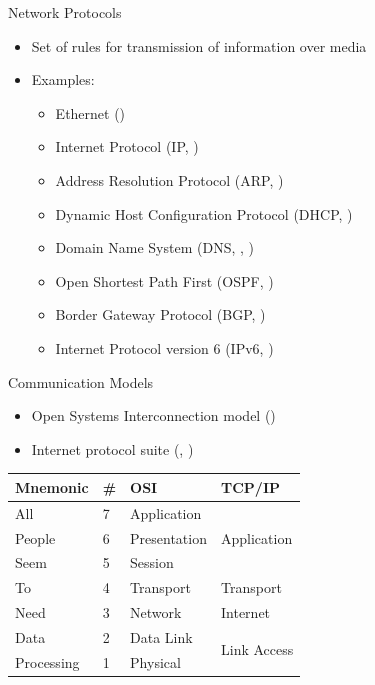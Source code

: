 \begin{frame}{Network Protocols}
	\begin{itemize}[<+->]
		\item Set of rules for transmission of information over media
		\item Examples:
		\begin{itemize}
			\item Ethernet ()
			\item Internet Protocol (IP, )
			\item Address Resolution Protocol (ARP, )
			\item Dynamic Host Configuration Protocol (DHCP, )
			\item Domain Name System (DNS, , )
			\item Open Shortest Path First (OSPF, )
			\item Border Gateway Protocol (BGP, )
			\item Internet Protocol version 6 (IPv6, )
		\end{itemize}
	\end{itemize}
\end{frame}
\begin{frame}{Communication Models}
	\begin{itemize}[<+->]
		\item Open Systems Interconnection model ()
		\item Internet protocol suite (, )
	\end{itemize}
	\begin{center}
	\begin{tabular}{|>{\onslide<4->}l<{\onslide<3->}|l|l|l|}
		\hline
		\textbf{Mnemonic}&  \textbf{\#} & \textbf{OSI} & \textbf{TCP/IP}              \\ \hline
		All              &  7           & Application  & \multirow{3}{*}{Application} \\ \cline{1-3}
		People           &  6           & Presentation &                              \\ \cline{1-3}
		Seem             &  5           & Session      &                              \\ \hline
		To               &  4           & Transport    & Transport                    \\ \hline
		Need             &  3           & Network      & Internet                     \\ \hline
		Data             &  2           & Data Link    & \multirow{2}{*}{Link Access} \\ \cline{1-3}
		Processing       &  1           & Physical     &                              \\ \hline
	\end{tabular}
	\end{center}
\end{frame}
